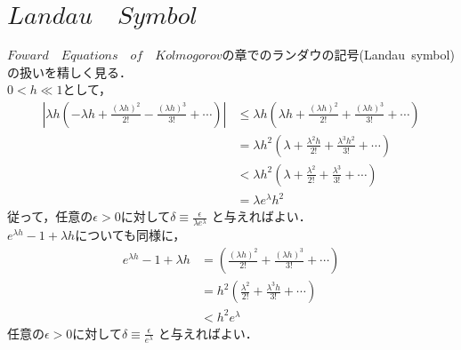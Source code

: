 \documentclass[a4j,papersize,disablejfam,slide,14pt]{jsarticle}
\def\exp#1{e^{#1}} %
\begin{document}
\section{$Landau\quad Symbol$}
\label{sec:appendix_landau}
	$Foward\quad Equations\quad of\quad Kolmogorov$の章でのランダウの記号{\rm (Landau\ symbol)}の扱いを精しく見る．\\
	$0 < h \ll 1$として，
    \begin{align}
    	\left| \lambda h \left(- \lambda h + \frac{(\lambda h)^2}{2!} - \frac{(\lambda h)^3}{3!} + \cdots \right) \right|
        &\leq \lambda h \left(\lambda h + \frac{(\lambda h)^2}{2!} + \frac{(\lambda h)^3}{3!} + \cdots \right) \\
        &= \lambda h^2 \left(\lambda + \frac{\lambda^2 h}{2!} + \frac{\lambda^3 h^2}{3!} + \cdots \right) \\
        &< \lambda h^2 \left(\lambda + \frac{\lambda^2}{2!} + \frac{\lambda^3}{3!} + \cdots \right) \\
        &= \lambda \exp{\lambda} h^2
    \end{align}
    従って，任意の$\epsilon > 0$に対して$\delta \equiv \frac{\epsilon}{\lambda \exp{\lambda}}$ と与えればよい．\\
    $\exp{\lambda h} - 1 + \lambda h$についても同様に，
    \begin{align}
    	\exp{\lambda h} - 1 + \lambda h &= \left(\frac{(\lambda h)^2}{2!} + \frac{(\lambda h)^3}{3!} + \cdots \right) \\
        &= h^2 \left(\frac{\lambda^2}{2!} + \frac{\lambda^3 h}{3!} + \cdots \right) \\
        &< h^2 \exp{\lambda}
    \end{align}
    任意の$\epsilon > 0$に対して$\delta \equiv \frac{\epsilon}{\exp{\lambda}}$ と与えればよい．
\end{document}
